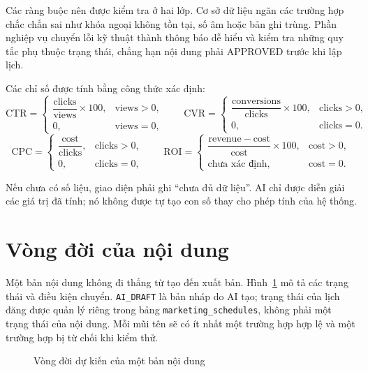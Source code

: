 Các ràng buộc nên được kiểm tra ở hai lớp. Cơ sở dữ liệu ngăn các trường hợp chắc chắn sai như khóa ngoại không tồn tại, số âm hoặc bản ghi trùng. Phần nghiệp vụ chuyển lỗi kỹ thuật thành thông báo dễ hiểu và kiểm tra những quy tắc phụ thuộc trạng thái, chẳng hạn nội dung phải APPROVED trước khi lập lịch.

Các chỉ số được tính bằng công thức xác định:
\[
\mathrm{CTR} =
\begin{cases}
\dfrac{\mathrm{clicks}}{\mathrm{views}}\times100, & \mathrm{views}>0,\\
0, & \mathrm{views}=0,
\end{cases}
\qquad
\mathrm{CVR} =
\begin{cases}
\dfrac{\mathrm{conversions}}{\mathrm{clicks}}\times100, & \mathrm{clicks}>0,\\
0, & \mathrm{clicks}=0.
\end{cases}
\]
\[
\mathrm{CPC} =
\begin{cases}
\dfrac{\mathrm{cost}}{\mathrm{clicks}}, & \mathrm{clicks}>0,\\
0, & \mathrm{clicks}=0,
\end{cases}
\qquad
\mathrm{ROI} =
\begin{cases}
\dfrac{\mathrm{revenue}-\mathrm{cost}}{\mathrm{cost}}\times100, & \mathrm{cost}>0,\\
\text{chưa xác định}, & \mathrm{cost}=0.
\end{cases}
\]

Nếu chưa có số liệu, giao diện phải ghi “chưa đủ dữ liệu”. AI chỉ được diễn giải các giá trị đã tính; nó không được tự tạo con số thay cho phép tính của hệ thống.

\section{Vòng đời của nội dung}

Một bản nội dung không đi thẳng từ tạo đến xuất bản. Hình~\ref{fig:v8-state} mô tả các trạng thái và điều kiện chuyển. \texttt{AI\_DRAFT} là bản nháp do AI tạo; trạng thái của lịch đăng được quản lý riêng trong bảng \texttt{marketing\_schedules}, không phải một trạng thái của nội dung. Mỗi mũi tên sẽ có ít nhất một trường hợp hợp lệ và một trường hợp bị từ chối khi kiểm thử.

\begin{figure}[h!]
\centering

\caption{Vòng đời dự kiến của một bản nội dung}
\label{fig:v8-state}
\end{figure}

